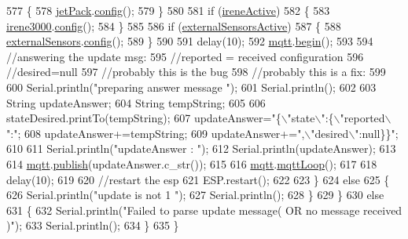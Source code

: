 \begin{DoxyCode}
577             \{
578                 \hyperlink{classCoolBoard_a30b1357881b01ccbec676856a91e48e9}{jetPack}.\hyperlink{classJetpack_ab065ee83e244265a2223a22f3ee4a719}{config}();
579             \}
580 
581             \textcolor{keywordflow}{if} (\hyperlink{classCoolBoard_a9c3f7ac625481ee2ae802a25d97a4ae0}{ireneActive})
582             \{
583                 \hyperlink{classCoolBoard_ad103718ce316006c4695b8eb312eaf11}{irene3000}.\hyperlink{classIrene3000_afed5c35e4b23963c157847ef27c11e9c}{config}();
584             \}
585 
586             \textcolor{keywordflow}{if} (\hyperlink{classCoolBoard_a638b00b76aeb819ecfd4c10b8cdd7bb7}{externalSensorsActive})
587             \{
588                 \hyperlink{classCoolBoard_a09e26264839c65873eb56af476eff6b2}{externalSensors}.\hyperlink{classExternalSensors_a862a4bd11346b37270d0244c2adabe5a}{config}();
589             \}
590 
591             delay(10);
592             \hyperlink{classCoolBoard_a2399f44d7c23c1149a335cb3b46d90f1}{mqtt}.\hyperlink{classCoolMQTT_ac9248808641ebf3054ed0620ea9d0100}{begin}();
593 
594                 \textcolor{comment}{//answering the update msg:}
595             \textcolor{comment}{//reported = received configuration}
596             \textcolor{comment}{//desired=null}
597             \textcolor{comment}{//probably this is the bug}
598             \textcolor{comment}{//probably this is a fix:}
599 
600             Serial.println(\textcolor{stringliteral}{"preparing answer message "});
601             Serial.println();
602             
603             String updateAnswer;
604             String tempString;
605             
606             stateDesired.printTo(tempString);
607             updateAnswer=\textcolor{stringliteral}{"\{\(\backslash\)"state\(\backslash\)":\{\(\backslash\)"reported\(\backslash\)":"};
608             updateAnswer+=tempString;
609             updateAnswer+=\textcolor{stringliteral}{",\(\backslash\)"desired\(\backslash\)":null\}\}"};
610 
611             Serial.println(\textcolor{stringliteral}{"updateAnswer : "});
612             Serial.println(updateAnswer);
613 
614             \hyperlink{classCoolBoard_a2399f44d7c23c1149a335cb3b46d90f1}{mqtt}.\hyperlink{classCoolMQTT_ace977b3e90ab14b1199fe5c4fb0a13ec}{publish}(updateAnswer.c\_str());
615             
616             \hyperlink{classCoolBoard_a2399f44d7c23c1149a335cb3b46d90f1}{mqtt}.\hyperlink{classCoolMQTT_aa5eaae967b562b62cbcf2b8d81f6e5d5}{mqttLoop}();
617 
618             delay(10);
619             
620             \textcolor{comment}{//restart the esp}
621             ESP.restart();
622                 
623         \}
624         \textcolor{keywordflow}{else}
625         \{
626             Serial.println(\textcolor{stringliteral}{"update is not 1 "});
627             Serial.println();
628         \}
629     \}
630     \textcolor{keywordflow}{else}
631     \{
632         Serial.println(\textcolor{stringliteral}{"Failed to parse update message( OR no message received )"});
633         Serial.println();   
634     \}       
635 \}
\end{DoxyCode}
